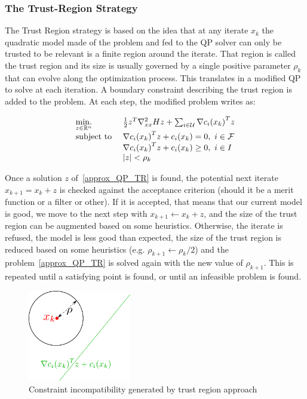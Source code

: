 \subsubsection{The Trust-Region Strategy}
\label{ssub:the_trust_region_strategy}
The Trust Region strategy is based on the idea that at any iterate $x_k$ the quadratic model made of the problem and fed to the QP solver can only be trusted to be relevant is a finite region around the iterate.
That region is called the trust region and its size is usually governed by a single positive parameter $\rho_k$ that can evolve along the optimization process.
This translates in a modified QP to solve at each iteration.
A boundary constraint describing the trust region is added to the problem.
At each step, the modified problem writes as:

\begin{equation}
  \begin{array}{ll}
    \operatorname*{min.}\limits_{z\in \mathbb{R}^n}{} & \frac{1}{2}z^T\nabla_{xx}^2Hz + \sum_{i\in\mathcal{U}}{\nabla c_i(x_k)}^T z \\
    \text{subject to } & {\nabla c_i(x_k)}^T z+c_i(x_k)=0,\ i\in \mathcal{F} \\
                       & {\nabla c_i(x_k)}^T z+c_i(x_k)\geq 0,\ i\in I\\
                       & |z|<\rho_k
  \end{array}
\label{approx_QP_TR}
\end{equation}

Once a solution $z$ of~\ref{approx_QP_TR} is found, the potential next iterate $x_{k+1} = x_k + z$ is checked against the acceptance criterion (should it be a merit function or a filter or other).
If it is accepted, that means that our current model is good, we move to the next step with $x_{k+1} \leftarrow x_k + z$, and the size of the trust region can be augmented based on some heuristics.
Otherwise, the iterate is refused, the model is less good than expected, the size of the trust region is reduced based on some heuristics (e.g. $\rho_{k+1}\leftarrow\rho_k /2$) and the problem~\ref{approx_QP_TR} is solved again with the new value of $\rho_{k+1}$.
This is repeated until a satisfying point is found, or until an infeasible problem is found.

\begin{figure}
  \centering
  \includegraphics[width=0.4\textwidth]{trust_region_incompatible.pdf}
  \caption{Constraint incompatibility generated by trust region approach}
\label{fig:TR_incompatible}
\end{figure}

